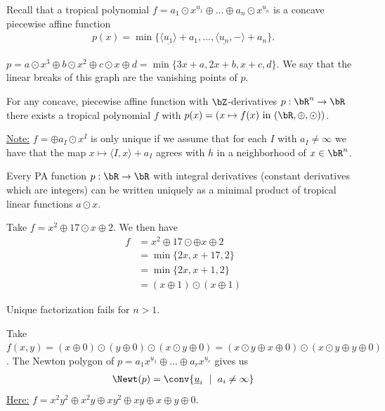 
Recall that a tropical polynomial $f = a_1\odot x^{\underline{u}_1}\oplus ... \oplus a_n\odot x^{\underline{u}_n}$ is a concave piecewise affine function
\begin{align*}
p(x) = \min \{\langle \underline{u_1}\rangle +a_1, ..., \langle \underline{u_n}, -\rangle + a_n\}.
\end{align*}
\begin{example}\label{example:arbitrary-cubic}
  $p = a\odot x^3 \oplus b\odot x^2 \oplus c\odot x \oplus d = \min\{3x+a, 2x + b, x + c, d\}$. We say that the linear breaks of this graph are the vanishing points of $p$.
\end{example}

\begin{lem}\label{lem:convace-piecewise-is-tropical-poly}
  For any concave, piecewise affine function with $\bZ$-derivatives $p:\bR^n \to \bR$ there exists a tropical polynomial $f$ with $p(x) = (x \mapsto f(x) \text{ in } (\bR,\oplus, \odot))$.
\end{lem}
\underline{Note:} $f = \oplus a_I\odot x^I$ is only unique if we assume that for each $I$ with $a_I \neq \infty$ we have that the map $x \mapsto \langle I,x \rangle + a_I$ agrees with $h$ in a neighborhood of $x \in \bR^n$.

\begin{exercise}\label{exercise:uniqueness-above}
  Every PA function $p:\bR\to \bR$ with integral derivatives (constant derivatives which are integers) can be written uniquely as a minimal product of tropical linear functions $a\odot x$.
\end{exercise}

\begin{example}\label{example:}
  Take $f = x^2 \oplus 17\odot x \oplus 2$. We then have
  \begin{align*}
    f &= x^2 \oplus 17\odot \oplus x\oplus 2 \\
      &= \min\{2x, x + 17, 2\} \\
      &= \min\{2x, x + 1, 2\} \\
      &= (x \oplus 1) \odot (x \oplus 1)
  \end{align*}
\end{example}

Unique factorization fails for $n > 1$.

\begin{example}\label{example:unique-factorization-fails}
Take $f(x,y) = (x\oplus 0) \odot (y\oplus 0) \odot (x\odot y\oplus 0) = (x\odot y \oplus x \oplus 0) \odot (x\odot y \oplus y \oplus 0)$. The Newton polygon of $p = a_1x^{\underline{u}_1} \oplus ... \oplus a_r x^{\underline{u}_r}$ gives us
\begin{align*}
  \Newt(p) = \conv\{\underline{u}_i ~\mid~ a_i \neq \infty\}
\end{align*}
\noindent \underline{Here:} $f = x^2y^2 \oplus x^2y \oplus xy^2 \oplus xy \oplus x \oplus y \oplus 0$.
\end{example}

